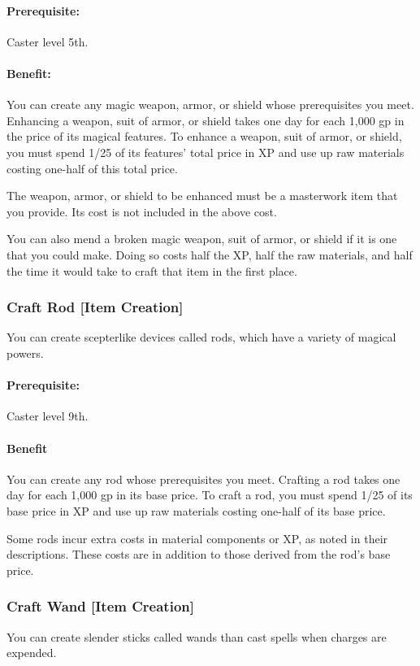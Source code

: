 \paragraph{Prerequisite:}
Caster level 5th.

\paragraph{Benefit:} You can create any magic weapon, armor, or shield whose prerequisites you meet. Enhancing a weapon, suit of armor, or shield takes one day for each 1,000 gp in the price of its magical features. To enhance a weapon, suit of armor, or shield, you must spend 1/25 of its features’ total price in XP and use up raw materials costing one-half of this total price.

The weapon, armor, or shield to be enhanced must be a masterwork item that you provide. Its cost is not included in the above cost.

You can also mend a broken magic weapon, suit of armor, or shield if it is one that you could make. Doing so costs half the XP, half the raw materials, and half the time it would take to craft that item in the first place.

\subsubsection[Craft Rod]{Craft Rod [Item Creation]}
\label{Feat:CraftRod}
You can create scepterlike devices called rods, which have a variety of magical powers.

\paragraph{Prerequisite:}
Caster level 9th.

\paragraph{Benefit}
You can create any rod whose prerequisites you meet. 
Crafting a rod takes one day for each 1,000 gp in its base price. 
To craft a rod, you must spend 1/25 of its base price in XP and use up raw materials costing one-half of its base price.

Some rods incur extra costs in material components or XP, as noted in their descriptions. 
These costs are in addition to those derived from the rod’s base price.

\subsubsection[Craft Wand]{Craft Wand [Item Creation]}
\label{Feat:CraftWand}
You can create slender sticks called wands than cast spells when charges are expended.

